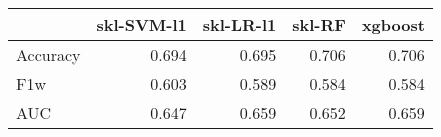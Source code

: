 \begin{tabular}{lrrrr}
\toprule
{} &  skl-SVM-l1 &  skl-LR-l1 &  skl-RF &  xgboost \\
\midrule
Accuracy &       0.694 &      0.695 &   0.706 &    0.706 \\
F1w      &       0.603 &      0.589 &   0.584 &    0.584 \\
AUC      &       0.647 &      0.659 &   0.652 &    0.659 \\
\bottomrule
\end{tabular}
